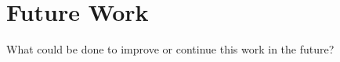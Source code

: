 \markboth{}{} %
\chapter{Future Work\label{chap:5}}
What could be done to improve or continue this work in the future?
